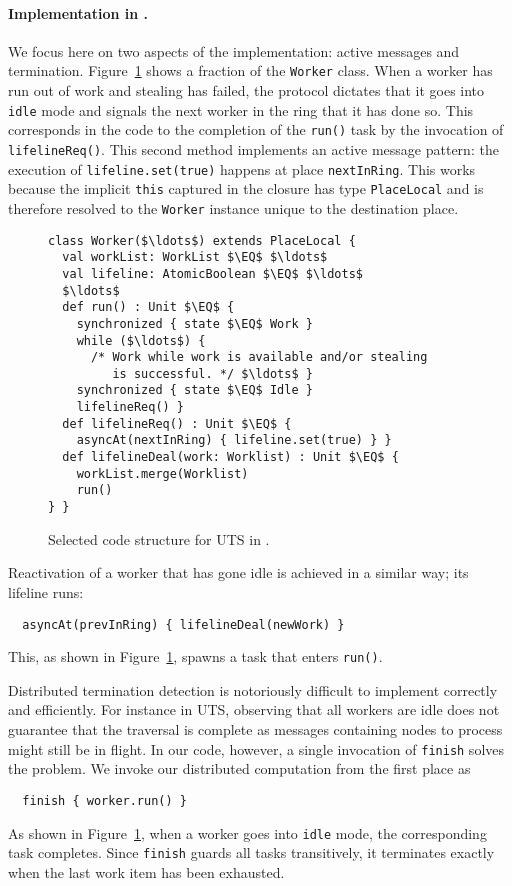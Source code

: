 \paragraph{Implementation in \apgas.} We focus here on two aspects of the
implementation: active messages and termination. Figure~\ref{fig:utsapgas}
shows a fraction of the \lstinline{Worker} class.
When a worker has run out of work and stealing has failed, the protocol
dictates that it goes into \lstinline{idle} mode and signals the next worker in
the ring that it has done so. This corresponds in the code to the completion of
the \lstinline{run()} task by the invocation of \lstinline{lifelineReq()}. This
second method implements an active message pattern: the execution of
\lstinline{lifeline.set(true)} happens at place \lstinline{nextInRing}. This
works because the implicit \lstinline{this} captured in the closure has type
\lstinline{PlaceLocal} and is therefore resolved to the \lstinline{Worker}
instance unique to the destination place.
\begin{figure}
\begin{lstlisting}
class Worker($\ldots$) extends PlaceLocal {
  val workList: WorkList $\EQ$ $\ldots$
  val lifeline: AtomicBoolean $\EQ$ $\ldots$
  $\ldots$
  def run() : Unit $\EQ$ {
    synchronized { state $\EQ$ Work }
    while ($\ldots$) {
      /* Work while work is available and/or stealing
         is successful. */ $\ldots$ }
    synchronized { state $\EQ$ Idle }
    lifelineReq() }
  def lifelineReq() : Unit $\EQ$ {
    asyncAt(nextInRing) { lifeline.set(true) } }
  def lifelineDeal(work: Worklist) : Unit $\EQ$ {
    workList.merge(Worklist)
    run()
} }
\end{lstlisting}
\caption{Selected code structure for UTS in \apgas.\label{fig:utsapgas}}
\end{figure}
Reactivation of a worker that has gone idle is achieved in a similar way; its
lifeline runs:
\begin{lstlisting}
  asyncAt(prevInRing) { lifelineDeal(newWork) }
\end{lstlisting}
This, as shown in Figure~\ref{fig:utsapgas}, spawns a task that enters
\lstinline{run()}.

Distributed termination detection is notoriously difficult to implement
correctly and efficiently. For instance in UTS, observing that all workers are
idle does not guarantee that the traversal is complete as messages containing
nodes to process might still be in flight. In our code, however, a single
invocation of \lstinline{finish} solves the problem.
We invoke our distributed computation from the first place as
\begin{lstlisting}
  finish { worker.run() }
\end{lstlisting}
As shown in Figure~\ref{fig:utsapgas}, when a worker goes into \lstinline{idle}
mode, the corresponding task completes. Since \lstinline{finish} guards all
tasks transitively, it terminates exactly when the last work item has been
exhausted.

